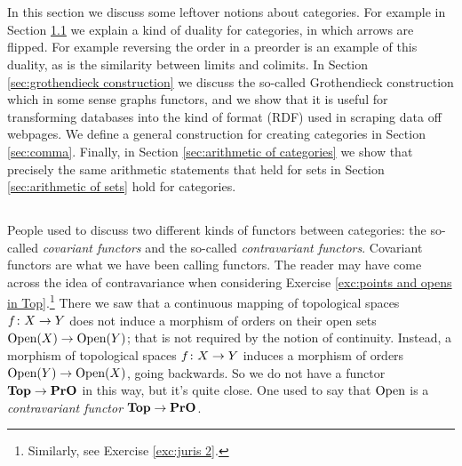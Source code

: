 

\section{}

In this section we discuss some leftover notions about categories. For example in Section \ref{sec:opposite} we explain a kind of duality for categories, in which arrows are flipped. For example reversing the order in a preorder is an example of this duality, as is the similarity between limits and colimits. In Section \ref{sec:grothendieck construction} we discuss the so-called Grothendieck construction which in some sense graphs functors, and we show that it is useful for transforming databases into the kind of format (RDF) used in scraping data off webpages. We define a general construction for creating categories in Section \ref{sec:comma}. Finally, in Section \ref{sec:arithmetic of categories} we show that precisely the same arithmetic statements that held for sets in Section \ref{sec:arithmetic of sets} hold for categories. 


\subsection{}\label{sec:opposite}

People used to discuss two different kinds of functors between categories: the so-called {\em covariant functors} and the so-called {\em contravariant functors}. Covariant functors are what we have been calling functors. The reader may have come across the idea of contravariance when considering Exercise \ref{exc:points and opens in Top}.\footnote{Similarly, see Exercise \ref{exc:juris 2}.} There we saw that a continuous mapping of topological spaces $f\colon X\rightarrow Y$ does not induce a morphism of orders on their open sets $\textnormal{Open}(X)\rightarrow\textnormal{Open}(Y)$; that is not required by the notion of continuity. Instead, a morphism of topological spaces $f\colon X\rightarrow Y$ induces a morphism of orders $\textnormal{Open}(Y)\rightarrow\textnormal{Open}(X)$, going backwards. So we do not have a functor ${\bf Top}\rightarrow{\bf PrO}$ in this way, but it's quite close. One used to say that $\textnormal{Open}$ is a {\em contravariant functor} ${\bf Top}\rightarrow{\bf PrO}$.

